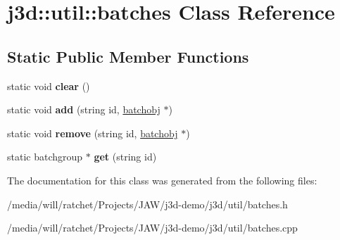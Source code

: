 \hypertarget{classj3d_1_1util_1_1batches}{}\section{j3d\+:\+:util\+:\+:batches Class Reference}
\label{classj3d_1_1util_1_1batches}
\subsection*{Static Public Member Functions}
\begin{DoxyCompactItemize}
\item 
\hypertarget{classj3d_1_1util_1_1batches_a01edc7b298c2b11b0e0ddbbdf317b2ac}{}static void {\bfseries clear} ()\label{classj3d_1_1util_1_1batches_a01edc7b298c2b11b0e0ddbbdf317b2ac}

\item 
\hypertarget{classj3d_1_1util_1_1batches_aba61e72ad08835c16579b3ad76f18354}{}static void {\bfseries add} (string id, \hyperlink{classj3d_1_1core_1_1Batch}{batchobj} $\ast$)\label{classj3d_1_1util_1_1batches_aba61e72ad08835c16579b3ad76f18354}

\item 
\hypertarget{classj3d_1_1util_1_1batches_a1a9fc5b090b7b7370116042dd934dba5}{}static void {\bfseries remove} (string id, \hyperlink{classj3d_1_1core_1_1Batch}{batchobj} $\ast$)\label{classj3d_1_1util_1_1batches_a1a9fc5b090b7b7370116042dd934dba5}

\item 
\hypertarget{classj3d_1_1util_1_1batches_a57d33b974391d3376ae82616d9f48c5c}{}static batchgroup $\ast$ {\bfseries get} (string id)\label{classj3d_1_1util_1_1batches_a57d33b974391d3376ae82616d9f48c5c}

\end{DoxyCompactItemize}


The documentation for this class was generated from the following files\+:\begin{DoxyCompactItemize}
\item 
/media/will/ratchet/\+Projects/\+J\+A\+W/j3d-\/demo/j3d/util/batches.\+h\item 
/media/will/ratchet/\+Projects/\+J\+A\+W/j3d-\/demo/j3d/util/batches.\+cpp\end{DoxyCompactItemize}
